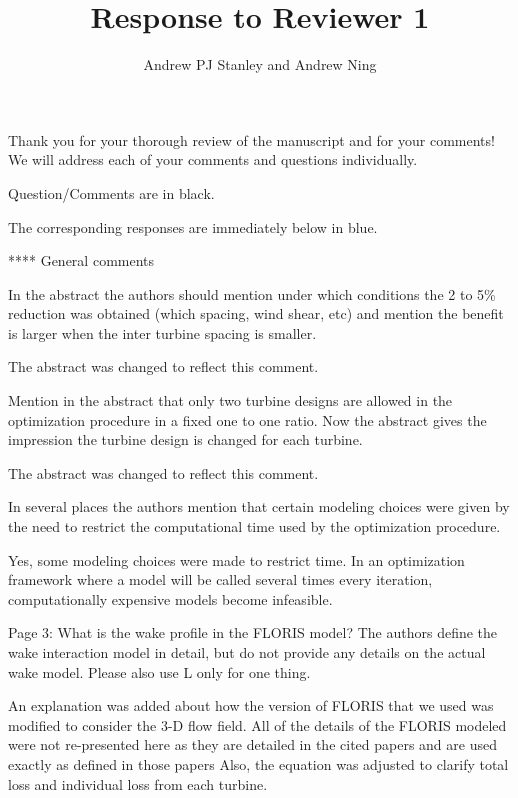 \documentclass[12pt]{report}
\title{Response to Reviewer 1}
\begin{document}
\author{Andrew PJ Stanley and Andrew Ning}

\maketitle

Thank you for your thorough review of the manuscript and for your comments! We will address each of your comments and questions individually.

\bigskip
Question/Comments are in black.

\color{blue} The corresponding responses are immediately below in blue.

\bigskip \color{black}
**** General comments

\bigskip \color{black}
In the abstract the authors should mention under which conditions the 2 to 5\% reduction was obtained (which spacing, wind shear, etc) and mention the benefit is larger when the inter turbine spacing is smaller.

\color{blue} The abstract was changed to reflect this comment.

\bigskip \color{black}
Mention in the abstract that only two turbine designs are allowed in the optimization procedure in a fixed one to one ratio. Now the abstract gives the impression the turbine design is changed for each turbine.

\color{blue} The abstract was changed to reflect this comment.

\bigskip \color{black}
In several places the authors mention that certain modeling choices were given by the need to restrict the computational time used by the optimization procedure.

\color{blue} Yes, some modeling choices were made to restrict time. In an optimization framework where a model will be called several times every iteration, computationally expensive models become infeasible.

\bigskip \color{black}
Page 3: What is the wake profile in the FLORIS model? The authors define the wake interaction model in detail, but do not provide any details on the actual wake model. Please also use L only for one thing.

\color{blue} An explanation was added about how the version of FLORIS that we used was modified to consider the 3-D flow field. All of the details of the FLORIS modeled were not re-presented here as they are detailed in the cited papers and are used exactly as defined in those papers
Also, the equation was adjusted to clarify total loss and individual loss from each turbine.
\end{document}
